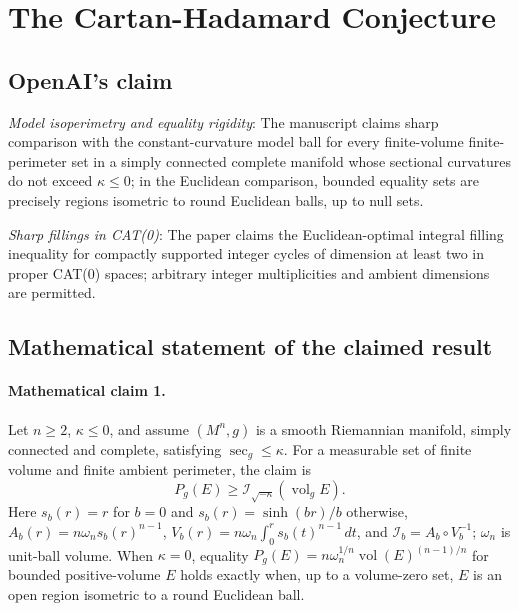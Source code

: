 \documentclass[11pt]{article}
\begin{document}
\section*{The Cartan-Hadamard Conjecture}

\subsection{OpenAI's claim}
\textit{Model isoperimetry and equality rigidity}: The manuscript claims sharp comparison with the constant-curvature model ball for every finite-volume finite-perimeter set in a simply connected complete manifold whose sectional curvatures do not exceed $\kappa\le0$; in the Euclidean comparison, bounded equality sets are precisely regions isometric to round Euclidean balls, up to null sets.

\textit{Sharp fillings in CAT(0)}: The paper claims the Euclidean-optimal integral filling inequality for compactly supported integer cycles of dimension at least two in proper CAT(0) spaces; arbitrary integer multiplicities and ambient dimensions are permitted.

\subsection{Mathematical statement of the claimed result}
\paragraph{Mathematical claim 1.} Let $n\ge2$, $\kappa\le0$, and assume $(M^n,g)$ is a smooth Riemannian manifold, simply connected and complete, satisfying $\sec_g\le\kappa$. For a measurable set of finite volume and finite ambient perimeter, the claim is \[P_g(E)\ge\mathcal I_{\sqrt{-\kappa}}(\operatorname{vol}_g E).\] Here $s_b(r)=r$ for $b=0$ and $s_b(r)=\sinh(br)/b$ otherwise, $A_b(r)=n\omega_ns_b(r)^{n-1}$, $V_b(r)=n\omega_n\int_0^rs_b(t)^{n-1}\,dt$, and $\mathcal I_b=A_b\circ V_b^{-1}$; $\omega_n$ is unit-ball volume. When $\kappa=0$, equality $P_g(E)=n\omega_n^{1/n}\operatorname{vol}(E)^{(n-1)/n}$ for bounded positive-volume $E$ holds exactly when, up to a volume-zero set, $E$ is an open region isometric to a round Euclidean ball.
\end{document}
